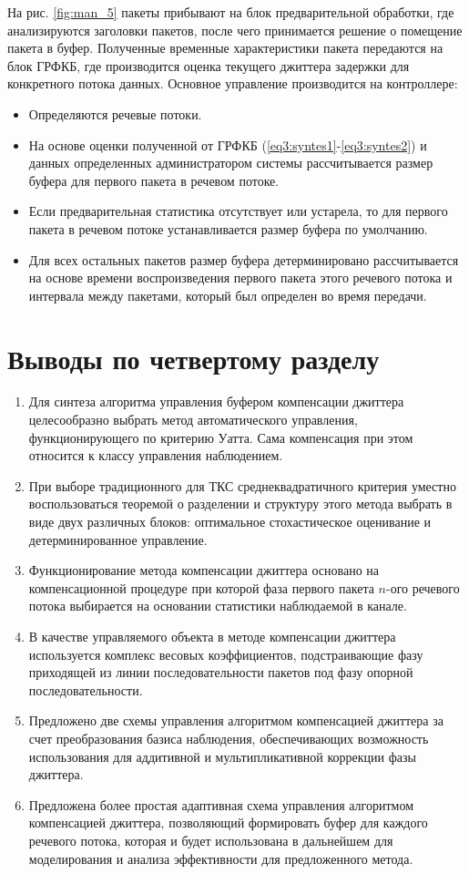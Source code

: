 На рис. \ref{fig:man_5} пакеты прибывают на блок предварительной обработки, где анализируются заголовки пакетов, после чего принимается решение о помещение пакета в буфер.
Полученные временные характеристики пакета передаются на блок ГРФКБ, где производится оценка текущего джиттера задержки для конкретного потока данных.
Основное управление производится на контроллере: 
\begin{itemize}
 \item Определяются речевые потоки.
 \item На основе оценки полученной от ГРФКБ (\ref{eq3:syntes1}-\ref{eq3:syntes2}) и данных определенных администратором системы рассчитывается размер буфера для первого пакета в речевом потоке.
 \item Если предварительная статистика отсутствует или устарела, то для первого пакета в речевом потоке устанавливается размер буфера по умолчанию.
 \item Для всех остальных пакетов размер буфера детерминировано рассчитывается на основе времени воспроизведения первого пакета этого речевого потока и интервала между пакетами, который был определен во время передачи.
\end{itemize}


\section{Выводы по четвертому разделу}
\begin{enumerate}
 \item Для синтеза алгоритма управления буфером компенсации джиттера целесообразно выбрать метод автоматического управления, функционирующего по критерию Уатта. 
 Сама компенсация при этом относится к классу управления наблюдением.
 \item При выборе традиционного для ТКС среднеквадратичного критерия уместно воспользоваться теоремой о разделении и структуру этого метода выбрать в виде двух различных блоков: оптимальное стохастическое оценивание и детерминированное управление.
 \item Функционирование метода компенсации джиттера основано на компенсационной процедуре при которой фаза первого пакета $n$-ого речевого потока выбирается на основании статистики наблюдаемой в канале.
 \item В качестве управляемого объекта в методе компенсации джиттера используется комплекс весовых коэффициентов, подстраивающие фазу приходящей из линии последовательности пакетов под фазу опорной последовательности.
 \item Предложено две схемы управления алгоритмом компенсацией джиттера за счет преобразования базиса наблюдения, обеспечивающих возможность использования для аддитивной и мультипликативной коррекции фазы джиттера.
 \item Предложена более простая адаптивная схема управления алгоритмом компенсацией джиттера, позволяющий формировать буфер для каждого речевого потока, которая и будет использована в дальнейшем для моделирования и анализа эффективности для предложенного метода.
\end{enumerate}
